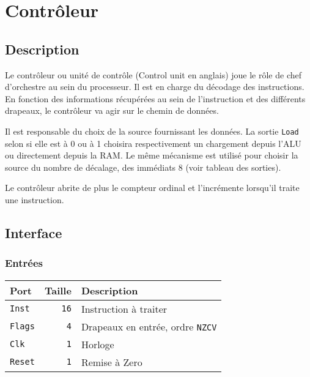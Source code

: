 \documentclass{article}
\begin{document}
    \section{Contrôleur}

    \subsection{Description}

    Le contrôleur ou unité de contrôle (Control unit en anglais) joue le rôle de chef d'orchestre au sein du processeur.
    Il est en charge du décodage des instructions.
    En fonction des informations récupérées au sein de l'instruction et des différents drapeaux, le contrôleur va agir sur le chemin de données.

    Il est responsable du choix de la source fournissant les données.
    La sortie \texttt{Load} selon si elle est à 0 ou à 1 choisira respectivement un chargement depuis l'ALU ou directement depuis la RAM.
    Le même mécanisme est utilisé pour choisir la source du nombre de décalage, des immédiats 8 (voir tableau des sorties).

    Le contrôleur abrite de plus le compteur ordinal et l'incrémente lorsqu'il traite une instruction.

    \subsection{Interface}

    \subsubsection{Entrées}

    \begin{tabular}{|l|r|l|}
        \hline
        \textbf{Port}  & \textbf{Taille} & \textbf{Description}                    \\
        \hline

        \texttt{Inst}  & \texttt{16}     & Instruction à traiter                   \\
        \hline
        \texttt{Flags} & \texttt{4}      & Drapeaux en entrée, ordre \texttt{NZCV} \\
        \hline
        \texttt{Clk}   & \texttt{1}      & Horloge                                 \\
        \hline
        \texttt{Reset} & \texttt{1}      & Remise à Zero                           \\
        \hline


        \hline
    \end{tabular}
\end{document}
